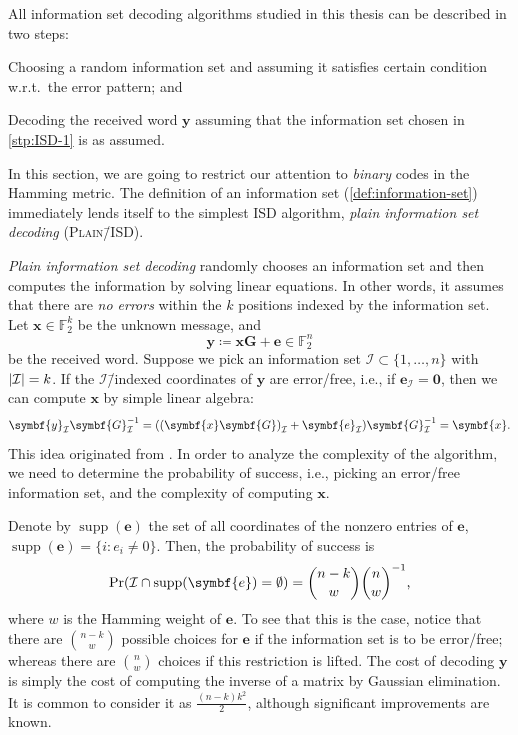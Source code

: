 \documentclass[version=last, paper=A4, parskip=half, oneside]{scrbook}
\theoremstyle{plain}
\theoremstyle{definition}
\theoremstyle{remark}
\renewcommand*{\vec}{\symbf}
\newcommand*{\mat}{\symbf}
\DeclareMathOperator{\supp}{supp}
\newcommand*{\FF}{\ensuremath{\mathbb{F}}}
\DeclarePairedDelimiter{\card}{\lvert}{\rvert}
\newcommand*{\PISD}{\textsc{Plain}\=/ISD}
\begin{document}
All information set decoding algorithms studied in this thesis can be described
in two steps:
\begin{steps}
\item\label{stp:ISD-1} Choosing a random information set and assuming it
  satisfies certain condition w.r.t.\ the error pattern; and
\item\label{stp:ISD-2} Decoding the received word \(\vec{y}\) assuming that the
  information set chosen in \cref{stp:ISD-1} is as assumed.
\end{steps}

In this section, we are going to restrict our attention to \emph{binary} codes
in the Hamming metric.  The definition of an information set
(\cref{def:information-set}) immediately lends itself to the simplest ISD
algorithm, \emph{plain information set decoding} (\PISD).

\emph{Plain information set decoding} randomly chooses an information set and
then computes the information by solving linear equations.  In other words, it
assumes that there are \emph{no errors} within the \(k\) positions indexed by
the information set.  Let \(\vec{x} \in \FF_2^k\) be the unknown message, and
\[
  \vec{y} \coloneqq \vec{x} \mat{G} + \vec{e} \in \FF_2^n
\]
be the received word.  Suppose we pick an information set
\(\mathcal{I} \subset \{1, \ldots, n\}\) with \(\card{\mathcal{I}} = k\).  If
the \(\mathcal{I}\)\=/indexed coordinates of \(\vec{y}\) are error\-/free,
i.e., if \(\vec{e}_{\mathcal{I}} = \vec{0}\), then we can compute \(\vec{x}\)
by simple linear algebra:
\[
  \vec{y}_{\mathcal{I}} \mat{G}_{\mathcal{I}}^{-1} =
  ({(\vec{x} \mat{G})}_{\mathcal{I}} + \vec{e}_{\mathcal{I}}) \mat{G}_{\mathcal{I}}^{-1} =
  \vec{x}\text.
\]
This idea originated from \textcite{Pra62}.  In order to analyze the complexity
of the algorithm, we need to determine the probability of success, i.e., picking
an error\-/free information set, and the complexity of computing \(\vec{x}\).


Denote by \(\supp(\vec{e})\) the set of all coordinates of the nonzero entries
of \(\vec{e}\), \(\supp(\vec{e}) = \{i : e_i \ne 0\}\).  Then, the probability
of success is
\[
  \Pr(\mathcal{I} \cap \supp(\vec{e}) = \emptyset) = \binom{n - k}{w}\binom{n}{w}^{-1}\text,
\]
where \(w\) is the Hamming weight of \(\vec{e}\).  To see that this is the case,
notice that there are \(\binom{n - k}{w}\) possible choices for \(\vec{e}\) if
the information set is to be error\-/free; whereas there are \(\binom{n}{w}\)
choices if this restriction is lifted.  The cost of decoding \(\vec{y}\) is
simply the cost of computing the inverse of a matrix by Gaussian elimination.
It is common to consider it as \(\frac{(n - k) k^2}{2}\), although significant
improvements are known.
\end{document}

